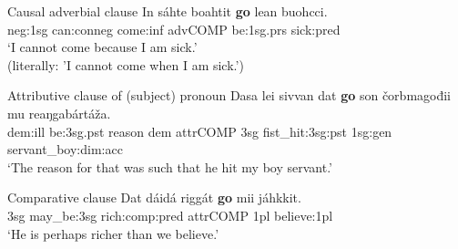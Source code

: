 \documentclass[a4,12pt]{scrartcl}
\begin{document}
\begin{exe}
	\ex Causal adverbial clause \label{goCausal}
\gll 	In 	sáhte 	boahtit 	{\bf go} 	lean 	buohcci.\\
	{\sc neg:1sg} can:{\sc conneg} come:{\sc inf} {\sc advCOMP} be:{\sc 1sg.prs} sick:{\sc pred}\\
\glt 	‘I cannot come because I am sick.’\\ (literally: 'I cannot come when I am sick.')%
\end{exe}

\begin{exe}

	\ex \label{goAttr} Attributive clause of (subject) pronoun \citep[439]{nickel1994}%
	\gll 	Dasa 	lei 	sivvan dat 	{\bf go} 	son 	čorbmagođii 	mu 	reaŋgabártáža.\\
	{\sc dem:ill} be:{\sc 3sg.pst} reason {\sc dem}  {\sc attrCOMP} {\sc 3sg} fist\_hit:{\sc 3sg:pst} {\sc 1sg:gen} servant\_boy:{\sc dim:acc}\\
	\glt 	‘The reason for that was such that he hit my boy servant.’ %

	\ex \label{goComp} Comparative clause \citep[199]{nickel1994} %
	\gll 	Dat 	dáidá 	riggát 	{\bf go} 	mii 	jáhkkit.\\
	{3sg}	may\_be:{\sc 3sg} rich:{comp:pred} {\sc attrCOMP} {\sc 1pl} believe:{\sc 1pl}\\
	\glt 	‘He is perhaps richer than we believe.’ %


\end{exe}
\end{document}
